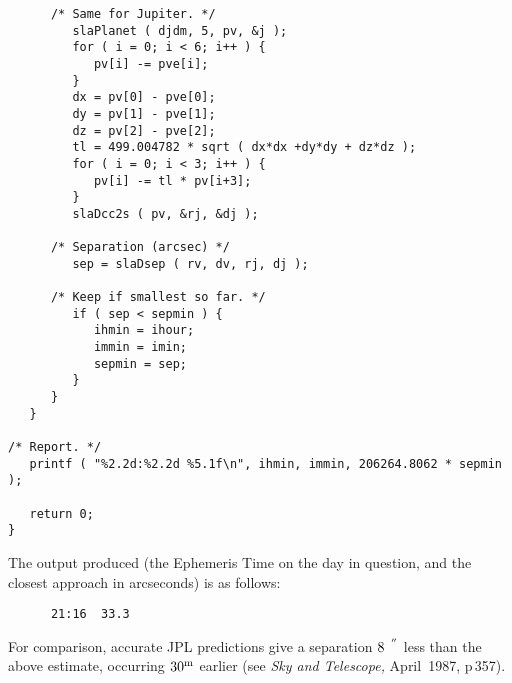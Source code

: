 \documentclass[11pt,fleqn,twoside]{article}
\renewcommand{\_}{{\tt\char'137}}     %
\newcommand{\arcseci}[1] {$#1\hspace{0.05em}$\raisebox{-0.5ex}
                         {$^{'\hspace{-0.1em}'\hspace{0.0em}}$}}
\begin{document}
\begin{verbatim}
      /* Same for Jupiter. */
         slaPlanet ( djdm, 5, pv, &j );
         for ( i = 0; i < 6; i++ ) {
            pv[i] -= pve[i];
         }
         dx = pv[0] - pve[0];
         dy = pv[1] - pve[1];
         dz = pv[2] - pve[2];
         tl = 499.004782 * sqrt ( dx*dx +dy*dy + dz*dz );
         for ( i = 0; i < 3; i++ ) {
            pv[i] -= tl * pv[i+3];
         }
         slaDcc2s ( pv, &rj, &dj );

      /* Separation (arcsec) */
         sep = slaDsep ( rv, dv, rj, dj );

      /* Keep if smallest so far. */
         if ( sep < sepmin ) {
            ihmin = ihour;
            immin = imin;
            sepmin = sep;
         }
      }
   }

/* Report. */
   printf ( "%2.2d:%2.2d %5.1f\n", ihmin, immin, 206264.8062 * sepmin );

   return 0;
}
\end{verbatim}
\vspace{-3ex}
\goodbreak

The output produced (the Ephemeris Time on the day in question, and
the closest approach in arcseconds) is as follows:
\goodbreak
\vspace{-3ex}
\begin{verbatim}
      21:16  33.3
\end{verbatim}
\vspace{-3ex}
\goodbreak
For comparison, accurate JPL predictions
give a separation \arcseci{8} less than
the above estimate, occurring $30^{\rm m}$ earlier
(see {\it Sky and Telescope,}\/ April~1987, p\,357).
\end{document}
